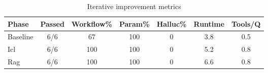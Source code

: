 \begin{table}[H]
\centering
\caption{Iterative improvement metrics}
\begin{tabular}{@{}lcccccc@{}}
\toprule
\textbf{Phase} & \textbf{Passed} & \textbf{Workflow\%} & \textbf{Param\%} & \textbf{Halluc\%} & \textbf{Runtime} & \textbf{Tools/Q} \\
\midrule
Baseline & 6/6 & 67 & 100 & 0 & 3.8 & 0.5 \\
Icl & 6/6 & 100 & 100 & 0 & 5.2 & 0.8 \\
Rag & 6/6 & 100 & 100 & 0 & 6.6 & 0.8 \\
\bottomrule
\end{tabular}
\end{table}

